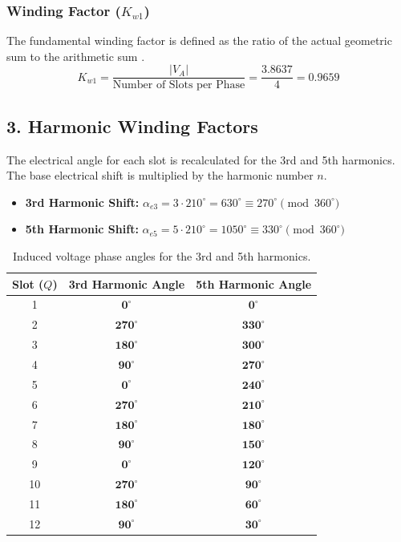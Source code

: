 \documentclass{article}
\begin{document}
\subsubsection*{Winding Factor ($K_{w1}$)}
The fundamental winding factor is defined as the ratio of the actual geometric sum to the arithmetic sum .
$$K_{w1} = \frac{|V_A|}{\text{Number of Slots per Phase}} = \frac{3.8637}{4} = \mathbf{0.9659}$$


\subsection*{3. Harmonic Winding Factors}

The electrical angle for each slot is recalculated for the 3rd and 5th harmonics. The base electrical shift is multiplied by the harmonic number $n$.
\begin{itemize}
    \item \textbf{3rd Harmonic Shift:} $\alpha_{e3} = 3 \cdot 210^\circ = 630^\circ \equiv 270^\circ \pmod{360^\circ}$
    \item \textbf{5th Harmonic Shift:} $\alpha_{e5} = 5 \cdot 210^\circ = 1050^\circ \equiv 330^\circ \pmod{360^\circ}$
\end{itemize}

\vspace{0.3cm}
\begin{table}[H]
\centering
\renewcommand{\arraystretch}{1.2}
\begin{tabular}{ccc}
\toprule
\textbf{Slot ($Q$)} & \textbf{3rd Harmonic Angle} & \textbf{5th Harmonic Angle} \\
\midrule
1 & $\mathbf{0^\circ}$ & $\mathbf{0^\circ}$ \\
2 & $\mathbf{270^\circ}$ & $\mathbf{330^\circ}$ \\
3 & $\mathbf{180^\circ}$ & $\mathbf{300^\circ}$ \\
4 & $\mathbf{90^\circ}$ & $\mathbf{270^\circ}$ \\
5 & $\mathbf{0^\circ}$ & $\mathbf{240^\circ}$ \\
6 & $\mathbf{270^\circ}$ & $\mathbf{210^\circ}$ \\
7 & $\mathbf{180^\circ}$ & $\mathbf{180^\circ}$ \\
8 & $\mathbf{90^\circ}$ & $\mathbf{150^\circ}$ \\
9 & $\mathbf{0^\circ}$ & $\mathbf{120^\circ}$ \\
10 & $\mathbf{270^\circ}$ & $\mathbf{90^\circ}$ \\
11 & $\mathbf{180^\circ}$ & $\mathbf{60^\circ}$ \\
12 & $\mathbf{90^\circ}$ & $\mathbf{30^\circ}$ \\
\bottomrule
\end{tabular}
\caption{Induced voltage phase angles for the 3rd and 5th harmonics.}
\end{table}
\end{document}
